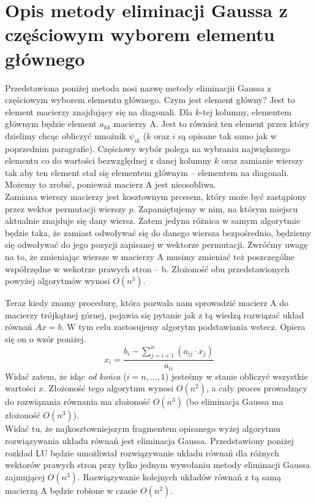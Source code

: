 \documentclass[]{article}
\begin{document}
	\section*{Opis metody eliminacji Gaussa z częściowym wyborem elementu głównego}
	Przedstawiona poniżej metoda nosi nazwę metody eliminacjii Gaussa z częściowym wyborem elementu głównego.
	Czym jest element główny? Jest to element macierzy znajdujący się na diagonali. Dla $k$-tej kolumny, elementem głównym będzie element $a_{kk}$ macierzy A. Jest to również ten element przez który dzielimy chcąc obliczyć mnożnik $\psi_{ik}$ ($k$ oraz $i$ są opisane tak samo jak w poprzednim paragrafie). Częściowy wybór polega na wybraniu największego elementu co do wartości bezwzględnej z danej kolumny $k$ oraz zamianie wierszy tak aby ten element stał się elementem głównym -- elementem na diagonali. Możemy to zrobić, ponieważ macierz A jest nieosobliwa. \\
	Zamiana wierszy macierzy jest kosztownym prcesem, który może być zastąpiony przez wektor permutacji wierszy $p$. Zapamiętujemy w nim, na którym miejscu aktualnie znajduje się dany wiersz. Zatem jedyna różnica w samym algorytmie będzie taka, że zamiast odwoływać się do danego wiersza bezpośrednio, będziemy się odwoływać do jego pozycji zapisanej w wektorze permutacji. Zwróćmy uwagę na to, że zmieniając wiersze w macierzy A musimy zmieniać też poszczególne współrzędne w wekotrze prawych stron -- b. Złożoność obu przedstawionych powyżej algorytmów wynosi $O(n^3)$.
	
	Teraz kiedy znamy procedurę, która pozwala nam sprowadzić macierz A do macierzy trójkątnej górnej, pojawia się pytanie jak z tą wiedzą rozwiązać układ równań $Ax = b$. W tym celu zastosujemy algorytm podstawiania wstecz. Opiera się on o wzór poniżej.
	$$x_i = \frac{b_i - \sum_{j = i+1}^n (a_{ij} \cdot x_j)}{a_{ii}}$$
	\clearpage
	Widać zatem, że idąc \textit{od końca} ($i=n,\ldots,1$) jesteśmy w stanie obliczyć wszystkie wartości $x$. Złożoność tego algorytmu wynosi $O(n^2)$, a cały proces prowadzący do rozwiązania równania ma złożoność $O(n^3)$ (bo eliminacja Gaussa ma złożoność $O(n^3)$). \\
	Widać tu, że najkosztowniejszym fragmentem opisanego wyżej algorytmu rozwiązywania układu równań jest eliminacja Gaussa. Przedstawiony poniżej rozkład LU będzie umożliwiał rozwiązywanie układu równań dla różnych wektorów prawych stron przy tylko jednym wywołaniu metody eliminacji Gaussa zajmującej $O(n^3)$. Rozwiązywanie kolejnych układów równań z tą samą macierzą A będzie robione w czasie $O(n^2)$.
	
\end{document}
